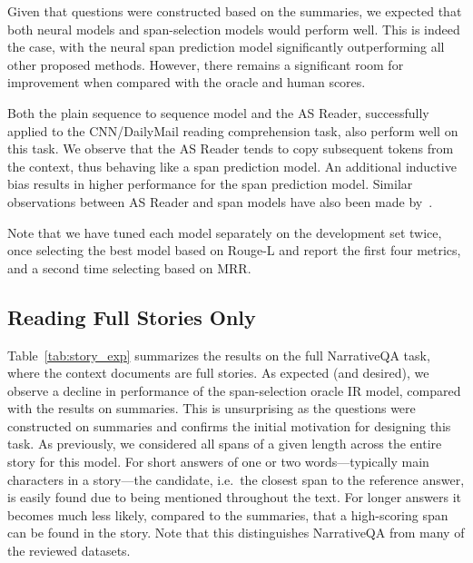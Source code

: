 \documentclass[11pt,letterpaper]{article}
\begin{document}
Given that questions were constructed based on the summaries, we expected that both neural models and span-selection models would perform well. This is indeed the case, with the neural span prediction model significantly outperforming all other proposed methods. However, there remains a significant room for improvement when compared with the oracle and human scores.



Both the plain sequence to sequence model and the AS Reader, successfully applied to the CNN/DailyMail reading comprehension task, also perform well on this task. We observe that the AS Reader tends to copy subsequent tokens from the context, thus behaving like a span prediction model.
An additional inductive bias results in higher performance for the span prediction model. Similar observations between AS Reader and span models have also been made
by~.

Note that we have tuned each model separately on the development set twice, once selecting the best model based on Rouge-L and report the first four metrics, and a second time selecting based on MRR.


\subsection{Reading Full Stories Only}
\label{sec:doc_results}




Table~\ref{tab:story_exp} summarizes the results on the full NarrativeQA task, where the context documents are full stories.
As expected (and desired), we observe a decline in performance of the span-selection oracle IR model, compared with the results on summaries. This is unsurprising as the questions 
were constructed on summaries and confirms the initial motivation for designing this task.
As previously, we considered all spans of a given length across the entire story for this model.
For short answers of one or two words---typically main characters in a story---the candidate, i.e.\ the closest span to the reference answer, is easily found due to being mentioned throughout the text.
For longer answers it becomes much less likely, compared to the summaries, that a high-scoring span can be found in the story. Note that this distinguishes NarrativeQA from many of the reviewed datasets.
\end{document}
